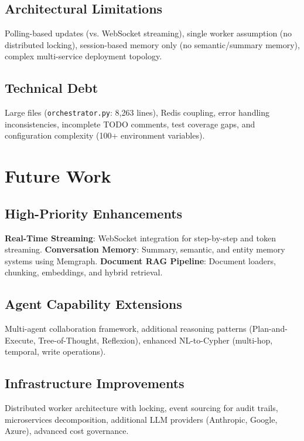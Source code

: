 \documentclass[a4paper,twoside]{sapthesis}
\begin{document}
\subsection{Architectural Limitations}

Polling-based updates (vs. WebSocket streaming), single worker assumption (no distributed locking), session-based memory only (no semantic/summary memory), complex multi-service deployment topology.

\subsection{Technical Debt}

Large files (\texttt{orchestrator.py}: 8,263 lines), Redis coupling, error handling inconsistencies, incomplete TODO comments, test coverage gaps, and configuration complexity (100+ environment variables).

\section{Future Work}
\label{sec:future-work}

\subsection{High-Priority Enhancements}

\textbf{Real-Time Streaming}: WebSocket integration for step-by-step and token streaming. \textbf{Conversation Memory}: Summary, semantic, and entity memory systems using Memgraph. \textbf{Document RAG Pipeline}: Document loaders, chunking, embeddings, and hybrid retrieval.

\subsection{Agent Capability Extensions}

Multi-agent collaboration framework, additional reasoning patterns (Plan-and-Execute, Tree-of-Thought, Reflexion), enhanced NL-to-Cypher (multi-hop, temporal, write operations).

\subsection{Infrastructure Improvements}

Distributed worker architecture with locking, event sourcing for audit trails, microservices decomposition, additional LLM providers (Anthropic, Google, Azure), advanced cost governance.
\end{document}
